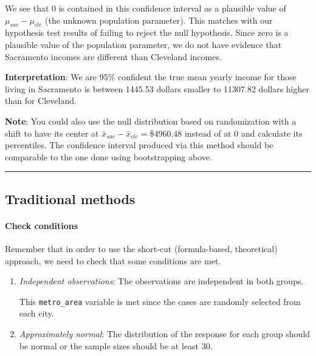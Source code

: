 \documentclass[12pt, krantz2,]{krantz}
\let\oldparagraph\paragraph
\renewcommand{\paragraph}[1]{\oldparagraph{#1}\mbox{}}
\begin{document}
We see that 0 is contained in this confidence interval as a plausible value of \(\mu_{sac} - \mu_{cle}\) (the unknown population parameter). This matches with our hypothesis test results of failing to reject the null hypothesis. Since zero is a plausible value of the population parameter, we do not have evidence that Sacramento incomes are different than Cleveland incomes.

\textbf{Interpretation}: We are 95\% confident the true mean yearly income for those living in Sacramento is between 1445.53 dollars smaller to 11307.82 dollars higher than for Cleveland.

\textbf{Note}: You could also use the null distribution based on randomization with a shift to have its center at \(\bar{x}_{sac} - \bar{x}_{cle} = \$4960.48\) instead of at 0 and calculate its percentiles. The confidence interval produced via this method should be comparable to the one done using bootstrapping above.

\begin{center}\rule{0.5\linewidth}{\linethickness}\end{center}

\hypertarget{traditional-methods-3}{%
\subsection{Traditional methods}\label{traditional-methods-3}}

\hypertarget{check-conditions-3}{%
\paragraph{Check conditions}\label{check-conditions-3}}

Remember that in order to use the short-cut (formula-based, theoretical) approach, we need to check that some conditions are met.

\begin{enumerate}
\def\labelenumi{\arabic{enumi}.}
\item
  \emph{Independent observations}: The observations are independent in both groups.

  This \texttt{metro\_area} variable is met since the cases are randomly selected from each city.
\item
  \emph{Approximately normal}: The distribution of the response for each group should be normal or the sample sizes should be at least 30.
\end{enumerate}
\end{document}
